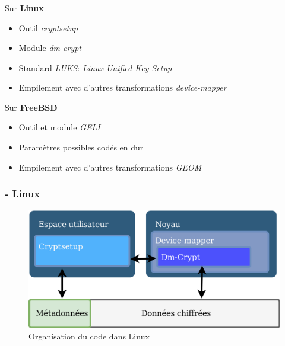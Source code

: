 \begin{frame}
  \frametitle{\insertsubsectionhead{}}
  \begin{block}{Sur \textbf{Linux}}
    \begin{itemize}
    \item Outil \textit{cryptsetup}
    \item Module \textit{dm-crypt}
    \item Standard \textit{LUKS}: \textit{Linux Unified Key Setup}
    \item Empilement avec d'autres transformations \textit{device-mapper}
    \end{itemize}
  \end{block}
  \begin{block}{Sur \textbf{FreeBSD}}
    \begin{itemize}
    \item Outil et module \textit{GELI}
    \item Paramètres possibles codés en dur
    \item Empilement avec d'autres transformations \textit{GEOM}
    \end{itemize}
  \end{block}
\end{frame}

\begin{frame}
  \frametitle{\insertsubsectionhead{} - \textbf{Linux}}
  \begin{figure}
    \includegraphics[width=\textwidth]{etat_art/organisation_linux}
    \caption{Organisation du code dans Linux}
  \end{figure}
\end{frame}

